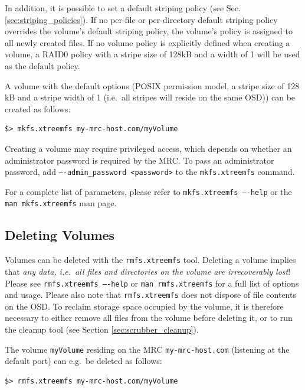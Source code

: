 \documentclass[a4paper,10pt]{book}
\begin{document}
In addition, it is possible to set a default striping policy (see Sec. \ref{sec:striping_policies}). If no per-file or per-directory default striping policy overrides the volume's default striping policy, the volume's policy is assigned to all newly created files. If no volume policy is explicitly defined when creating a volume, a RAID0 policy with a stripe size of 128kB and a width of 1 will be used as the default policy.

A volume with the default options (POSIX permission model, a stripe size of 128 kB and a stripe width of 1 (i.e.\ all stripes will reside on the same OSD)) can be created as follows:


\begin{verbatim}
$> mkfs.xtreemfs my-mrc-host.com/myVolume
\end{verbatim}

Creating a volume may require privileged access, which depends on whether an administrator password is required by the MRC. To pass an administrator password, add \texttt{----admin\_password <password>} to the \texttt{mkfs.xtreemfs} command.

For a complete list of parameters, please refer to \texttt{mkfs.xtreemfs ----help} or the \texttt{man mkfs.xtreemfs} man page.

\subsection{Deleting Volumes}

Volumes can be deleted with the \texttt{rmfs.xtreemfs} tool. Deleting a volume implies that \emph{any data, i.e.\ all files and directories on the volume are irrecoverably lost}! Please see \texttt{rmfs.xtreemfs ----help} or \texttt{man rmfs.xtreemfs} for a full list of options and usage. Please also note that \texttt{rmfs.xtreemfs} does not dispose of file contents on the OSD. To reclaim storage space occupied by the volume, it is therefore necessary to either remove all files from the volume before deleting it, or to run the cleanup tool (see Section \ref{sec:scrubber_cleanup}).

The volume \texttt{myVolume} residing on the MRC \texttt{my-mrc-host.com} (listening at the default port) can e.g.\ be deleted as follows:

\begin{verbatim}
$> rmfs.xtreemfs my-mrc-host.com/myVolume
\end{verbatim}
\end{document}
